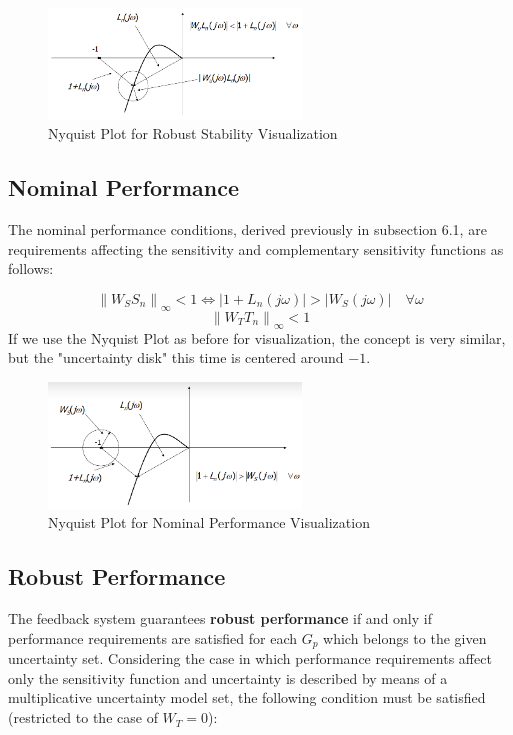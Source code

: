 \documentclass[a4paper,10pt,titlepage]{article}
\numberwithin{equation}{subsection}
\begin{document}
	\begin{figure}[H] %
		\centering
		\includegraphics[width=0.6\textwidth]{images/robust_stability_proof.png}
		\caption{Nyquist Plot for Robust Stability Visualization}
		\label{fig:image8}
	\end{figure}
	
	\subsection{Nominal Performance}
	The nominal performance conditions, derived previously in subsection 6.1, are requirements affecting the sensitivity and complementary sensitivity functions as follows:
	
	\begin{equation}
		\left\lVert W_SS_n \right\rVert_\infty < 1 \iff \left| 1+L_n(j\omega) \right| > \left| W_S(j\omega) \right| \quad \forall\omega 
	\end{equation}
	\begin{equation}
		\left\lVert W_TT_n \right\rVert_\infty < 1 
	\end{equation}
	If we use the Nyquist Plot as before for visualization, the concept is very similar, but the "uncertainty disk" this time is centered around $-1$.
	
	\begin{figure}[H] %
		\centering
		\includegraphics[width=0.6\textwidth]{images/nominal_performance_proof.png}
		\caption{Nyquist Plot for Nominal Performance Visualization}
		\label{fig:image9}
	\end{figure}
	
	\subsection{Robust Performance}
	The feedback system guarantees \textbf{robust performance} if and only if performance requirements are satisfied for each $G_p$ which belongs to the given uncertainty set.
	Considering the case in which performance requirements affect only the sensitivity function and uncertainty is described by means of a multiplicative uncertainty model set, the following condition must be satisfied (restricted to the case of $W_T = 0$):
	
\end{document}

